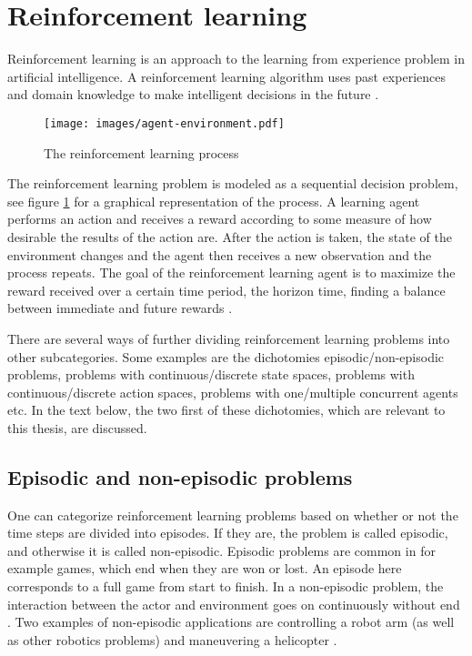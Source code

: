 \section{Reinforcement learning}

Reinforcement learning is an approach to the learning from experience problem in artificial intelligence. A reinforcement learning algorithm uses past experiences and domain knowledge to make intelligent decisions in the future \parencite{barto1998reinforcement}.

\begin{figure}[H]
\texttt{[image: images/agent-environment.pdf]}
\caption{The reinforcement learning process}
\label{fig:agentandenvironment}
\end{figure}

The reinforcement learning problem is modeled as a sequential decision problem, see figure \ref{fig:agentandenvironment} for a graphical representation of the process. A learning agent performs an action and receives a reward according to some measure of how desirable the results of the action are.  After the action is taken, the state of the environment changes and the agent then receives a new observation and the process repeats. The goal of the reinforcement learning agent is to maximize the reward received over a certain time period, the horizon time, finding a balance between immediate and future rewards \parencite{barto1998reinforcement}. 

There are several ways of further dividing reinforcement learning problems into other subcategories. Some examples are the dichotomies episodic/non-episodic problems, problems with continuous/discrete state spaces, problems with continuous/discrete action spaces, problems with one/multiple concurrent agents etc. In the text below, the two first of these dichotomies, which are relevant to this thesis, are discussed. 

\subsection{Episodic and non-episodic problems}
One can categorize reinforcement learning problems based on whether or not the time steps are divided into episodes. If they are, the problem is called episodic, and otherwise it is called non-episodic. Episodic problems are common in for example games, which end when they are won or lost. An episode here corresponds to a full game from start to finish. In a non-episodic problem, the interaction between the actor and environment goes on continuously without end \parencite{barto1998reinforcement}. Two examples of non-episodic applications are controlling a robot arm (as well as other robotics problems) and maneuvering a helicopter \parencite{ng2006autonomous}. 

